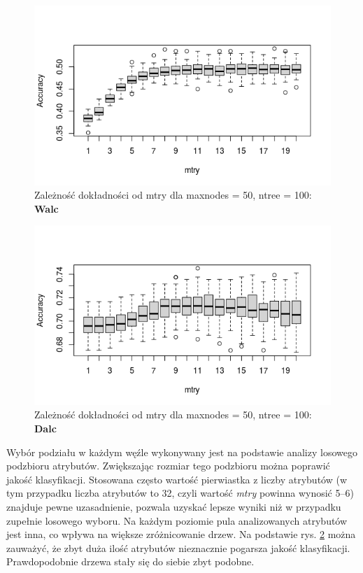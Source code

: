 \FloatBarrier
\begin{figure}[h]
     \centering 
     \includegraphics[scale=0.80]{tex/W_mtry.png}
      \caption{Zależność dokładności od mtry dla maxnodes = 50, ntree = 100: \textbf{Walc}}
      \label{fig:W_mtry}
\end{figure}
\begin{figure}[t]
     \centering 
     \includegraphics[scale=0.80]{tex/D_mtry.png}
     \caption{Zależność dokładności od mtry dla maxnodes = 50, ntree = 100: \textbf{Dalc}}
     \label{fig:D_mtry}
\end{figure}
\FloatBarrier
Wybór podziału w każdym węźle wykonywany jest na podstawie analizy losowego podzbioru atrybutów. Zwiększając rozmiar tego podzbioru można poprawić jakość klasyfikacji. Stosowana często wartość pierwiastka z liczby atrybutów (w tym przypadku liczba atrybutów to 32, czyli wartość \textit{mtry} powinna wynosić 5--6) znajduje pewne uzasadnienie, pozwala uzyskać lepsze wyniki niż w przypadku zupełnie losowego wyboru. Na każdym poziomie pula analizowanych atrybutów jest inna, co wpływa na większe zróżnicowanie drzew. Na podstawie rys. \ref{fig:D_mtry} można zauważyć, że zbyt duża ilość atrybutów nieznacznie pogarsza jakość klasyfikacji. Prawdopodobnie drzewa stały się do siebie zbyt podobne.
